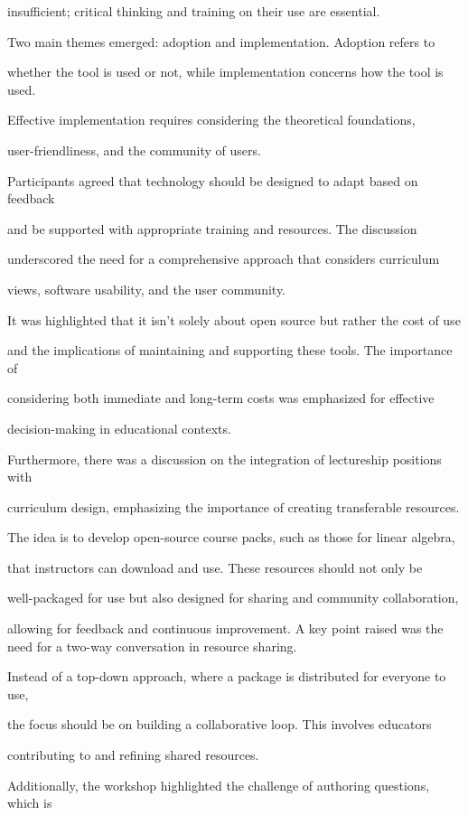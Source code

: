 \documentclass[11pt]{article}
\begin{document}
insufficient; critical thinking and training on their use are essential.

Two main themes emerged: adoption and implementation. Adoption refers to

whether the tool is used or not, while implementation concerns how the tool is used.

Effective implementation requires considering the theoretical foundations,

user-friendliness, and the community of users.

Participants agreed that technology should be designed to adapt based on feedback

and be supported with appropriate training and resources. The discussion

underscored the need for a comprehensive approach that considers curriculum

views, software usability, and the user community.

It was highlighted that it isn't solely about open source but rather the cost of use

and the implications of maintaining and supporting these tools. The importance of

considering both immediate and long-term costs was emphasized for effective

decision-making in educational contexts.

Furthermore, there was a discussion on the integration of lectureship positions with

curriculum design, emphasizing the importance of creating transferable resources.

The idea is to develop open-source course packs, such as those for linear algebra,

that instructors can download and use. These resources should not only be

well-packaged for use but also designed for sharing and community collaboration,

allowing for feedback and continuous improvement. A key point raised was the need for a two-way conversation in resource sharing.

Instead of a top-down approach, where a package is distributed for everyone to use,

the focus should be on building a collaborative loop. This involves educators

contributing to and refining shared resources.

Additionally, the workshop highlighted the challenge of authoring questions, which is
\end{document}
